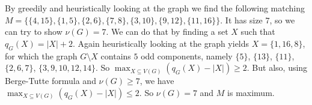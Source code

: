 \newcommand{\sheet}{4}




\maketitle

\begin{exercise}{1}
    By greedily and heuristically looking at the graph we find the following
    matching $M = \{ \{4, 15\}, \{1, 5\}, \{2, 6\}, \{7, 8\}, \{3, 10\}, \{9,
    12\}, \{11, 16\} \}$. It has size $7$, so we can try to show $\nu(G) = 7$.
    We can do that by finding a set $X$ such that $q_G(X) = |X| + 2$. Again
    heuristically looking at the graph yields $X = \{1, 16, 8\}$, for which the
    graph $G \setminus X$ contains $5$ odd components, namely $\{5\}$, $\{13\}$,
    $\{11\}$, $\{2, 6, 7\}$, $\{3, 9, 10, 12, 14\}$. So $\max_{X \subseteq V(G)}
    (q_G(X) - |X|) \geq 2$. But also, using Berge-Tutte formula and $\nu(G) \geq
    7$, we have $\max_{X \subseteq V(G)} (q_G(X) - |X|) \leq 2$. So $\nu(G) = 7$
    and $M$ is maximum.
\end{exercise}

